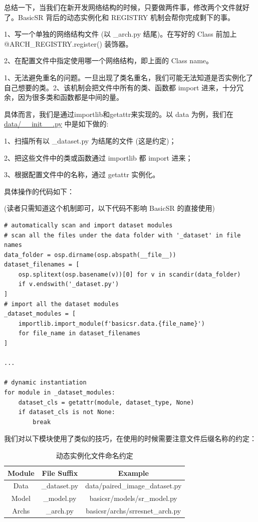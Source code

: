 \documentclass[../main.tex]{subfiles}
\begin{document}
总结一下，当我们在新开发网络结构的时候，只要做两件事，修改两个文件就好了。BasicSR 背后的动态实例化和 REGISTRY 机制会帮你完成剩下的事。

1、写一个单独的网络结构文件 (以 \_arch.py 结尾)。在写好的 Class 前加上 @ARCH\_REGISTRY.register() 装饰器。

2、在配置文件中指定使用哪一个网络结构，即上面的 Class name。



1、无法避免重名的问题。一旦出现了类名重名，我们可能无法知道是否实例化了自己想要的类。2、该机制会把文件中所有的类、函数都 import 进来，十分冗余，因为很多类和函数都是中间的量。

具体而言，我们是通过importlib和getattr来实现的。以 data 为例，我们在 \href{https://github.com/XPixelGroup/BasicSR/blob/master/basicsr/data/__init__.py}{data/\_\_init\_\_.py} 中是如下做的:

1、扫描所有以 \_dataset.py 为结尾的文件 (这是约定)；

2、把这些文件中的类或函数通过 importlib 都 import 进来；

3、根据配置文件中的名称，通过 getattr 实例化。

具体操作的代码如下：

(读者只需知道这个机制即可，以下代码不影响 BasicSR 的直接使用)
\begin{verbatim}
# automatically scan and import dataset modules
# scan all the files under the data folder with '_dataset' in file names
data_folder = osp.dirname(osp.abspath(__file__))
dataset_filenames = [
    osp.splitext(osp.basename(v))[0] for v in scandir(data_folder)
    if v.endswith('_dataset.py')
]
# import all the dataset modules
_dataset_modules = [
    importlib.import_module(f'basicsr.data.{file_name}')
    for file_name in dataset_filenames
]

...

# dynamic instantiation
for module in _dataset_modules:
    dataset_cls = getattr(module, dataset_type, None)
    if dataset_cls is not None:
        break
\end{verbatim}

我们对以下模块使用了类似的技巧，在使用的时候需要注意文件后缀名称的约定：
\begin{table}[h]
    \centering
    \begin{tabular}{|c|c|c|}
        \hline
        \textbf{Module} & \textbf{File Suffix} & \textbf{Example}                \\ \hline
        Data            & \_dataset.py         & data/paired\_image\_dataset.py  \\ \hline
        Model           & \_model.py           & basicsr/models/sr\_model.py     \\ \hline
        Archs           & \_arch.py            & basicsr/archs/srresnet\_arch.py \\ \hline
    \end{tabular}
    \caption{动态实例化文件命名约定}
\end{table}
\end{document}
